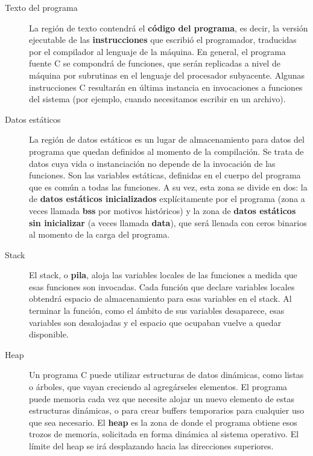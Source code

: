 \begin{description}
	\item[Texto del programa] La región de texto contendrá el \textbf{código del programa}, es decir, la versión ejecutable de las
\textbf{instrucciones} que escribió el programador, traducidas por el compilador al lenguaje de la máquina. En
general, el programa fuente C se compondrá de funciones, que serán replicadas a nivel de máquina por
subrutinas en el lenguaje del procesador subyacente. Algunas instrucciones C resultarán en última
instancia en invocaciones a funciones del sistema (por ejemplo, cuando necesitamos escribir en un
archivo).
	\item[Datos estáticos] La región de datos estáticos es un lugar de almacenamiento para datos del programa que quedan
definidos al momento de la compilación. Se trata de datos cuya vida o instanciación no depende de la
invocación de las funciones. Son las variables estáticas, definidas en el cuerpo del programa que es
común a todas las funciones. A su vez, esta zona se divide en dos: la de \textbf{datos estáticos inicializados}
explícitamente por el programa (zona a veces llamada \textbf{bss} por motivos históricos) y la zona de \textbf{datos
estáticos sin inicializar} (a veces llamada \textbf{data}), que será llenada con ceros binarios al momento de la
carga del programa.
	\item[Stack] El stack, o \textbf{pila}, aloja las variables locales de las funciones a medida que esas funciones son invocadas. Cada función que declare variables locales obtendrá espacio de almacenamiento para esas variables en el stack. Al terminar la función, como el ámbito de sus variables desaparece, esas variables son desalojadas y el espacio que ocupaban vuelve a quedar disponible. 
	\item[Heap] Un programa C puede utilizar estructuras de datos dinámicas, como listas o árboles, que vayan
creciendo al agregárseles elementos. El programa puede  memoria cada vez que necesite alojar
un nuevo elemento de estas estructuras dinámicas, o para crear buffers temporarios para cualquier uso
que sea necesario. El \textbf{heap} es la zona de donde el programa obtiene esos trozos de memoria, solicitada en forma dinámica al sistema operativo. El límite del heap se irá desplazando hacia las direcciones superiores.

\end{description}



